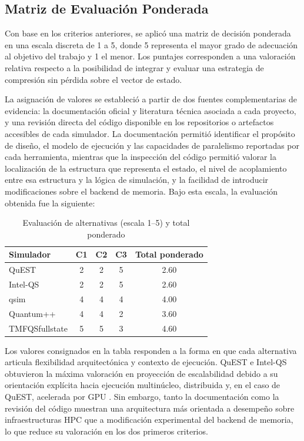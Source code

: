 \subsection{Matriz de Evaluación Ponderada}

Con base en los criterios anteriores, se aplicó una matriz de decisión ponderada en una
escala discreta de 1 a 5, donde 5 representa el mayor grado de adecuación al objetivo
del trabajo y 1 el menor. Los puntajes corresponden a una valoración relativa respecto a
la posibilidad de integrar y evaluar una estrategia de compresión sin pérdida sobre el
vector de estado.

La asignación de valores se estableció a partir de dos fuentes complementarias de
evidencia: la documentación oficial y literatura técnica asociada a cada proyecto, y una
revisión directa del código disponible en los repositorios o artefactos accesibles de
cada simulador. La documentación permitió identificar el propósito de diseño, el
modelo de ejecución y las capacidades de paralelismo reportadas por cada herramienta,
mientras que la inspección del código permitió valorar la localización de la estructura
que representa el estado, el nivel de acoplamiento entre esa estructura y la lógica de
simulación, y la facilidad de introducir modificaciones sobre el backend de memoria.
Bajo esta escala, la evaluación obtenida fue la siguiente:

\begin{table}[H]
\centering
\caption{Evaluación de alternativas (escala 1--5) y total ponderado}
\label{tab:evaluacion_sim}
\begin{tabular}{lcccc}
\hline
\textbf{Simulador} & \textbf{C1} & \textbf{C2} & \textbf{C3} & \textbf{Total ponderado} \\
\hline
QuEST          & 2 & 2 & 5 & 2.60 \\
Intel-QS       & 2 & 2 & 5 & 2.60 \\
qsim           & 4 & 4 & 4 & 4.00 \\
Quantum++      & 4 & 4 & 2 & 3.60 \\
TMFQSfullstate & 5 & 5 & 3 & 4.60 \\
\hline
\end{tabular}
\end{table}

Los valores consignados en la tabla responden a la forma en que cada alternativa
articula flexibilidad arquitectónica y contexto de ejecución. QuEST e Intel-QS
obtuvieron la máxima valoración en proyección de escalabilidad debido a su orientación
explícita hacia ejecución multinúcleo, distribuida y, en el caso de QuEST, acelerada
por GPU \parencite{Jones2019, quest_repo, intelqs_doc}. Sin embargo, tanto la
documentación como la revisión del código muestran una arquitectura más orientada a
desempeño sobre infraestructuras HPC que a modificación experimental del backend de
memoria, lo que reduce su valoración en los dos primeros criterios.

